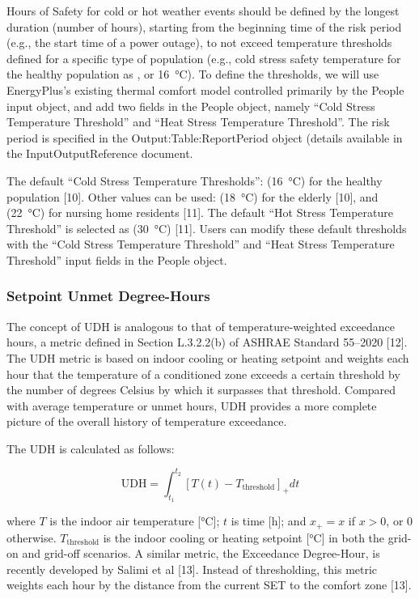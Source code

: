 Hours of Safety for cold or hot weather events should be defined by the longest
duration (number of hours), starting from the beginning time of the risk period
(e.g., the start time of a power outage), to not exceed temperature thresholds
defined for a specific type of population (e.g., cold stress safety temperature
for the healthy population as , or \SI{16}{\celsius}). To define the
thresholds, we will use EnergyPlus's existing thermal comfort model controlled
primarily by the People input object, and add two fields in the People object,
namely ``Cold Stress Temperature Threshold'' and ``Heat Stress Temperature
Threshold''. The risk period is specified in the Output:Table:ReportPeriod object (details available in the InputOutputReference document.

The default ``Cold Stress Temperature Thresholds'':  (\SI{16}{\celsius})
for the healthy population [10]. Other values can be used: 
(\SI{18}{\celsius}) for the elderly [10], and  (\SI{22}{\celsius}) for nursing
home residents [11]. The default ``Hot Stress Temperature Threshold'' is
selected as  (\SI{30}{\celsius}) [11]. Users can modify these default
thresholds with the ``Cold Stress Temperature Threshold'' and ``Heat Stress
Temperature Threshold'' input fields in the People object.

\subsubsection{Setpoint Unmet Degree-Hours}\label{unmet-degree-hours}

The concept of UDH is analogous to that of temperature-weighted exceedance
hours, a metric defined in Section L.3.2.2(b) of ASHRAE Standard 55–2020 [12].
The UDH metric is based on indoor cooling or heating setpoint and weights each
hour that the temperature of a conditioned zone exceeds a certain threshold by
the number of degrees Celsius by which it surpasses that threshold. Compared
with average temperature or unmet hours, UDH provides a more complete picture of
the overall history of temperature exceedance.

The UDH is calculated as follows:

\begin{equation}\label{eq:udh}
\text{UDH} = \int_{t_1}^{t_2}[T(t) - T_{\text{threshold}}]_+dt
\end{equation}

where $T$ is the indoor air temperature [\si{\celsius}]; $t$ is time [h]; and $x_+ = x$
if $x > 0$, or 0 otherwise. $T_{\text{threshold}}$ is the indoor cooling or heating setpoint
[\si{\celsius}] in both the grid-on and grid-off scenarios. A similar metric, the
Exceedance Degree-Hour, is recently developed by Salimi et al [13]. Instead of
thresholding, this metric weights each hour by the distance from the current SET
to the comfort zone [13].

